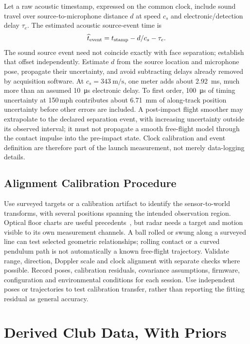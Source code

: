 Let a raw acoustic timestamp, expressed on the common clock, include sound travel over source-to-microphone distance $d$ at speed $c_s$ and electronic/detection delay $\tau_e$.
The estimated acoustic source-event time is
\begin{equation}
\widehat t_{\rm event}=t_{\rm stamp}-d/c_s-\tau_e.
\label{eq:impleventtime}
\end{equation}
The sound source event need not coincide exactly with face separation; establish that offset independently.
Estimate $d$ from the source location and microphone pose, propagate their uncertainty, and avoid subtracting delays already removed by acquisition software.
At $c_s=\SI{343}{\meter\per\second}$, one meter adds about \SI{2.92}{\milli\second}, much more than an assumed \SI{10}{\micro\second} electronic delay.
To first order, \SI{100}{\micro\second} of timing uncertainty at 150\,mph contributes about \SI{6.71}{\milli\meter} of along-track position uncertainty before other errors are included.
A post-impact flight smoother may extrapolate to the declared separation event, with increasing uncertainty outside its observed interval; it must not propagate a smooth free-flight model through the contact impulse into the pre-impact state.
Clock calibration and event definition are therefore part of the launch measurement, not merely data-logging details.

\subsection{Alignment Calibration Procedure}

Use surveyed targets or a calibration artifact to identify the sensor-to-world transforms, with several positions spanning the intended observation region.
Optical floor charts are useful precedents~\cite{uneekorcalib}, but radar needs a target and motion visible to its own measurement channels.
A ball rolled or swung along a surveyed line can test selected geometric relationships; rolling contact or a curved pendulum path is not automatically a known free-flight trajectory.
Validate range, direction, Doppler scale and clock alignment with separate checks where possible.
Record poses, calibration residuals, covariance assumptions, firmware, configuration and environmental conditions for each session.
Use independent poses or trajectories to test calibration transfer, rather than reporting the fitting residual as general accuracy.

\section{Derived Club Data, With Priors}
\label{app:priors}

